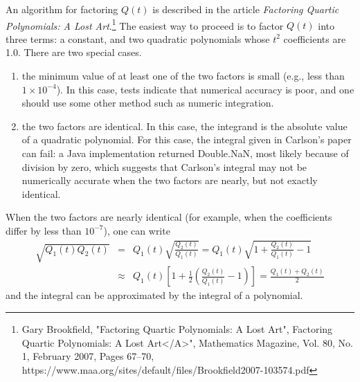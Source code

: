 \documentclass[12pt]{article}
\begin{document}
An algorithm for factoring $Q(t)$ is described
in the article \emph{Factoring Quartic Polynomials: A Lost Art}.\footnote {
    Gary Brookfield, "Factoring Quartic Polynomials: A Lost Art",
    Factoring Quartic Polynomials: A Lost Art</A>",
    Mathematics Magazine, Vol. 80, No. 1, February 2007, Pages 67--70,
    https://www.maa.org/sites/default/files/Brookfield2007-103574.pdf
}
The easiest way to proceed is to factor $Q(t)$ into three terms:
a constant, and two quadratic polynomials whose $t^2$ coefficients are
1.0. There are two special cases.
\begin{enumerate}
  \item the minimum value of at least one of the two factors is
	small (e.g., less than $1 \times 10^{-4}$). In this case,
	tests indicate that numerical accuracy is poor, and one should
	use some other method such as numeric integration.
  \item the two factors are identical.  In this case, the integrand
	is the absolute value of a quadratic polynomial. For this case,
	the integral given in Carlson's paper can fail: a Java implementation
	returned Double.NaN, most likely because of division by zero,
	which suggests that Carlson's integral may not be numerically
	accurate when the two factors are nearly, but not exactly
	identical.
\end{enumerate}
When the two factors are nearly identical (for example, when the
coefficients differ by less than $10^{-7}$), one can write
\begin{eqnarray*}
\sqrt{Q_1(t)Q_2(t)} & = & Q_1(t)\sqrt{\frac{Q_2(t)}{Q_1(t)}}
 =  Q_1(t)\sqrt{1 + \frac{Q_2(t)}{Q_1(t)} - 1} \\
& \approx & Q_1(t)\left[1 + \frac12 (\frac{Q_2(t)}{Q_1(t)} - 1)
\right]
= \frac{Q_1(t) + Q_2(t)}{2}
\end{eqnarray*}
and the integral can be approximated by the integral of a polynomial.
\end{document}
